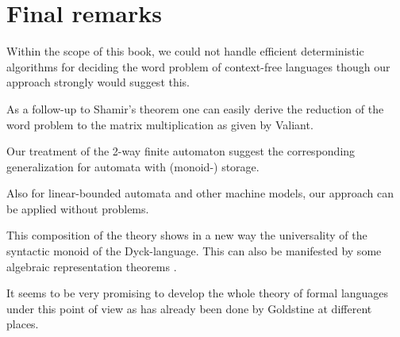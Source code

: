 \chapter*{Final remarks}

Within the scope of this book, we could not handle efficient deterministic
algorithms for deciding the word problem of context-free languages though our approach 
strongly would suggest this.

As a follow-up to Shamir's theorem one can easily derive the
reduction of the word problem to the matrix multiplication as given by Valiant.

Our treatment of the 2-way finite automaton suggest the corresponding
generalization for automata with (monoid-) storage.

Also for linear-bounded automata and other machine models, our approach can be
applied without problems.

This composition of the theory shows in a new way the universality of the
syntactic monoid of the Dyck-language. This can also be manifested by some algebraic 
representation theorems \cite{Hotz81}.

It seems to be very promising to develop the whole theory of formal languages
under this point of view as has already been done by Goldstine
\cite{Goldstine77,Goldstine79,Goldstine80} at different places.
